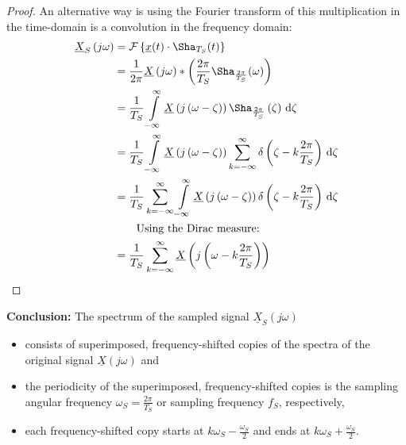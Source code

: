 \begin{refsection}
\begin{proof}{}
	An alternative way is using the Fourier transform of this multiplication in the time-domain is a convolution in the frequency domain:
	\begin{equation}
		\begin{split}
			\underline{X}_S\left(j \omega\right) &= \mathcal{F}\left\{\underline{x}(t) \cdot \Sha_{T_S}(t)\right\} \\
			 &= \frac{1}{2 \pi} \underline{X}\left(j \omega\right) * \left(\frac{2 \pi}{T_S} \Sha_{\frac{2 \pi}{T_S}}(\omega)\right) \\
			 &= \frac{1}{T_S} \int\limits_{-\infty}^{\infty} \underline{X}\left(j \left(\omega - \zeta\right)\right) \Sha_{\frac{2 \pi}{T_S}}\left(\zeta\right) \, \mathrm{d} \zeta \\
			 &= \frac{1}{T_S} \int\limits_{-\infty}^{\infty} \underline{X}\left(j \left(\omega - \zeta\right)\right) \sum\limits_{k = -\infty}^{\infty} \delta\left(\zeta - k \frac{2 \pi}{T_S}\right) \, \mathrm{d} \zeta \\
			 &= \frac{1}{T_S} \sum\limits_{k = -\infty}^{\infty} \int\limits_{-\infty}^{\infty} \underline{X}\left(j \left(\omega - \zeta\right)\right) \delta\left(\zeta - k \frac{2 \pi}{T_S}\right) \, \mathrm{d} \zeta \\
			 & \qquad \text{Using the Dirac measure:} \\
			 &= \frac{1}{T_S} \sum\limits_{k = -\infty}^{\infty} \underline{X}\left(j \left(\omega - k \frac{2 \pi}{T_S}\right)\right) \\
		\end{split}
	\end{equation}
\end{proof}

\textbf{Conclusion:} The spectrum of the sampled signal $\underline{X}_S\left(j \omega\right)$
\begin{itemize}
	\item consists of superimposed, frequency-shifted copies of the spectra of the original signal $\underline{X}\left(j\omega\right)$ and
	\item the periodicity of the superimposed, frequency-shifted copies is the sampling angular frequency $\omega_S = \frac{2 \pi}{T_S}$ or sampling frequency $f_S$, respectively,
	\item each frequency-shifted copy starts at $k \omega_S - \frac{\omega_S}{2}$ and ends at $k \omega_S + \frac{\omega_S}{2}$.
\end{itemize}


\end{refsection}
